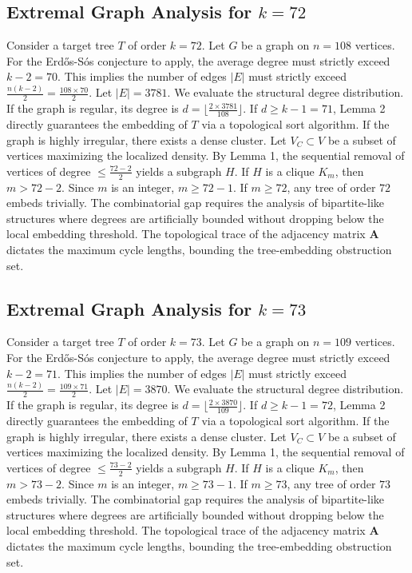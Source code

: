 \documentclass[11pt,a4paper]{article}
\begin{document}
\subsection{Extremal Graph Analysis for $k=72$}
Consider a target tree $T$ of order $k=72$.
Let $G$ be a graph on $n=108$ vertices.
For the Erd\H{o}s-S\'os conjecture to apply, the average degree must strictly exceed $k-2 = 70$.
This implies the number of edges $|E|$ must strictly exceed $\frac{n(k-2)}{2} = \frac{108 \times 70}{2}$.
Let $|E| = 3781$.
We evaluate the structural degree distribution. If the graph is regular, its degree is $d = \lfloor \frac{2 \times 3781}{108} \rfloor$.
If $d \geq k-1 = 71$, Lemma 2 directly guarantees the embedding of $T$ via a topological sort algorithm.
If the graph is highly irregular, there exists a dense cluster. Let $V_C \subset V$ be a subset of vertices maximizing the localized density.
By Lemma 1, the sequential removal of vertices of degree $\leq \frac{72-2}{2}$ yields a subgraph $H$.
If $H$ is a clique $K_{m}$, then $m > 72-2$. Since $m$ is an integer, $m \geq 72-1$. If $m \geq 72$, any tree of order $72$ embeds trivially.
The combinatorial gap requires the analysis of bipartite-like structures where degrees are artificially bounded without dropping below the local embedding threshold. The topological trace of the adjacency matrix $\mathbf{A}$ dictates the maximum cycle lengths, bounding the tree-embedding obstruction set.


\subsection{Extremal Graph Analysis for $k=73$}
Consider a target tree $T$ of order $k=73$.
Let $G$ be a graph on $n=109$ vertices.
For the Erd\H{o}s-S\'os conjecture to apply, the average degree must strictly exceed $k-2 = 71$.
This implies the number of edges $|E|$ must strictly exceed $\frac{n(k-2)}{2} = \frac{109 \times 71}{2}$.
Let $|E| = 3870$.
We evaluate the structural degree distribution. If the graph is regular, its degree is $d = \lfloor \frac{2 \times 3870}{109} \rfloor$.
If $d \geq k-1 = 72$, Lemma 2 directly guarantees the embedding of $T$ via a topological sort algorithm.
If the graph is highly irregular, there exists a dense cluster. Let $V_C \subset V$ be a subset of vertices maximizing the localized density.
By Lemma 1, the sequential removal of vertices of degree $\leq \frac{73-2}{2}$ yields a subgraph $H$.
If $H$ is a clique $K_{m}$, then $m > 73-2$. Since $m$ is an integer, $m \geq 73-1$. If $m \geq 73$, any tree of order $73$ embeds trivially.
The combinatorial gap requires the analysis of bipartite-like structures where degrees are artificially bounded without dropping below the local embedding threshold. The topological trace of the adjacency matrix $\mathbf{A}$ dictates the maximum cycle lengths, bounding the tree-embedding obstruction set.
\end{document}
